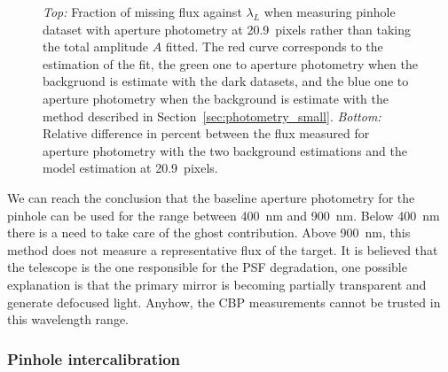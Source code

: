 \begin{figure}[h]
     \centering
     \caption{\textit{Top:} Fraction of missing flux against $\lambda_L$ when measuring \spinhole pinhole dataset with aperture photometry at \SI{20.9}{pixels} rather than taking the total amplitude $A$ fitted. The red curve corresponds to the estimation of the fit, the green one to aperture photometry when the backgruond is estimate with the dark datasets, and the blue one to aperture photometry when the background is estimate with the method described in Section~\ref{sec:photometry_small}. \textit{Bottom:} Relative difference in percent between the flux measured for aperture photometry with the two background estimations and the model estimation at \SI{20.9}{pixels}.}
     \label{fig:bias_aperture}
\end{figure}

We can reach the conclusion that the baseline aperture photometry for the \spinhole pinhole can be used for the range between \SI{400}{\nano\meter} and \SI{900}{\nano\meter}. Below \SI{400}{\nano\meter} there is a need to take care of the ghost contribution. Above \SI{900}{\nano\meter}, this method does not measure a representative flux of the target. It is believed that the \SD telescope is the one responsible for the PSF degradation, one possible explanation is that the primary mirror is becoming partially transparent and generate defocused light. Anyhow, the CBP measurements cannot be trusted in this wavelength range. 

\subsubsection{Pinhole intercalibration}

